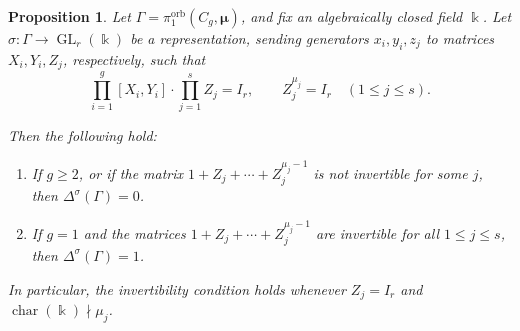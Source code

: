 \documentclass[11pt]{amsart}
\newtheorem{proposition}[theorem]{Proposition}
\theoremstyle{definition}
\renewcommand{\k}{\Bbbk}
\DeclareMathOperator{\ch}{char}
\DeclareMathOperator{\GL}{GL}
\DeclareMathOperator{\orb}{orb}
\begin{document}
\begin{proposition}
\label{prop:compact-orbifold-group}
Let $\Gamma=\pi_1^{\orb}(C_g,\bm{\mu})$, and fix an algebraically
closed field $\k$. Let $\sigma \colon \Gamma \to \GL_r(\k)$ 
be a representation, sending generators $x_i,y_i,z_j$ to matrices
$X_i,Y_i,Z_j$, respectively, such that
\[
\prod_{i=1}^{g}[X_i,Y_i]\cdot \prod_{j=1}^{s} Z_j = I_r,
\qquad
Z_j^{\mu_j}=I_r \quad (1\le j\le s).
\]

Then the following hold:
\begin{enumerate}
\item If $g\ge 2$, or if the matrix $1+Z_j+\cdots+Z_j^{\mu_j-1}$ 
is not invertible for some $j$, then $\Delta^\sigma(\Gamma)=0$.

\item If $g=1$ and the matrices $1+Z_j+\cdots+Z_j^{\mu_j-1}$ 
are invertible for all $1\le j\le s$, then $\Delta^\sigma(\Gamma)=1$.
\end{enumerate}

In particular, the invertibility condition holds whenever
$Z_j=I_r$ and $\ch(\k)\nmid \mu_j$.
\end{proposition}    
\end{document}
